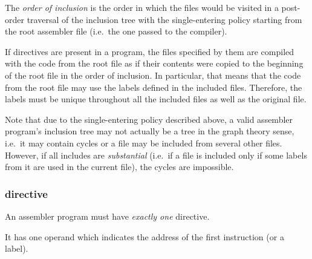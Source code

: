 The \textit{order of inclusion} is the order in which the files would be visited
in a post-order traversal of the inclusion tree with the single-entering policy
starting from the root  assembler file
(i.e.\ the one passed to the compiler).

If  directives are present in a program, the files specified by them
are compiled with the code from the root file as if their contents were
copied to the beginning of the root file in the order of inclusion.
In particular, that means that the code from the root file may use
the labels defined in the included files.
Therefore, the labels must be unique throughout all the included files
as well as the original file.

Note that due to the single-entering policy described above, a valid 
assembler program's inclusion tree may not actually be a tree in the graph
theory sense, i.e.\ it may contain cycles or a file may be included from several
other files.
However, if all includes are \textit{substantial} (i.e.\ if a file is included
only if some labels from it are used in the current file), the cycles are
impossible.

\vspace{-0.35cm}

\hypertarget{directives:end}{
    \subsubsection{ directive}
}

\vspace{-0.2cm}

An assembler program must have \textit{exactly one}  directive.

It has one operand which indicates the address of the first instruction
(or a label).
